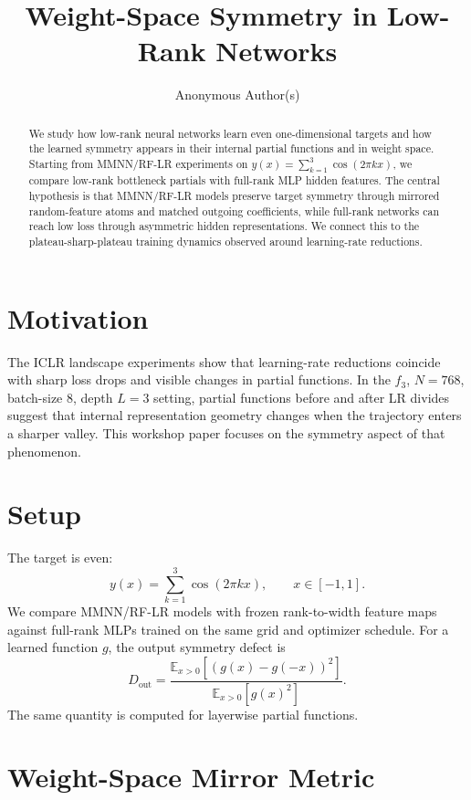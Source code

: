 \documentclass{article}
\title{Weight-Space Symmetry in Low-Rank Networks}
\author{Anonymous Author(s)}
\begin{document}
\maketitle

\begin{abstract}
We study how low-rank neural networks learn even one-dimensional targets and how the learned symmetry appears in their internal partial functions and in weight space. Starting from MMNN/RF-LR experiments on $y(x)=\sum_{k=1}^{3}\cos(2\pi kx)$, we compare low-rank bottleneck partials with full-rank MLP hidden features. The central hypothesis is that MMNN/RF-LR models preserve target symmetry through mirrored random-feature atoms and matched outgoing coefficients, while full-rank networks can reach low loss through asymmetric hidden representations. We connect this to the plateau-sharp-plateau training dynamics observed around learning-rate reductions.
\end{abstract}

\section{Motivation}

The ICLR landscape experiments show that learning-rate reductions coincide with sharp loss drops and visible changes in partial functions. In the $f_3$, $N=768$, batch-size $8$, depth $L=3$ setting, partial functions before and after LR divides suggest that internal representation geometry changes when the trajectory enters a sharper valley. This workshop paper focuses on the symmetry aspect of that phenomenon.

\section{Setup}

The target is even:
\[
y(x)=\sum_{k=1}^{3}\cos(2\pi kx), \qquad x\in[-1,1].
\]
We compare MMNN/RF-LR models with frozen rank-to-width feature maps against full-rank MLPs trained on the same grid and optimizer schedule. For a learned function $g$, the output symmetry defect is
\[
D_{\mathrm{out}}=\frac{\mathbb{E}_{x>0}\left[(g(x)-g(-x))^2\right]}{\mathbb{E}_{x>0}\left[g(x)^2\right]}.
\]
The same quantity is computed for layerwise partial functions.

\section{Weight-Space Mirror Metric}
\end{document}

